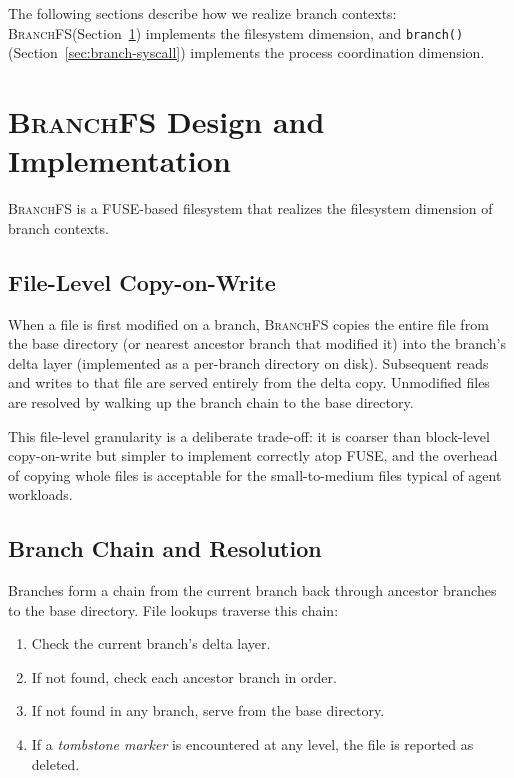 \documentclass[sigconf]{acmart}
\newcommand{\sys}{\textsc{BranchFS}\xspace}
\newcommand{\syscall}{\texttt{branch()}\xspace}
\begin{document}
\noindent The following sections describe how we realize branch contexts: \sys (Section~\ref{sec:branchfs}) implements the filesystem dimension, and \syscall (Section~\ref{sec:branch-syscall}) implements the process coordination dimension.

\section{\sys Design and Implementation}
\label{sec:branchfs}

\sys is a FUSE-based filesystem that realizes the filesystem dimension of branch contexts.

\subsection{File-Level Copy-on-Write}

When a file is first modified on a branch, \sys copies the entire file from the base directory (or nearest ancestor branch that modified it) into the branch's delta layer (implemented as a per-branch directory on disk). Subsequent reads and writes to that file are served entirely from the delta copy. Unmodified files are resolved by walking up the branch chain to the base directory.

This file-level granularity is a deliberate trade-off: it is coarser than block-level copy-on-write but simpler to implement correctly atop FUSE, and the overhead of copying whole files is acceptable for the small-to-medium files typical of agent workloads.

\subsection{Branch Chain and Resolution}

Branches form a chain from the current branch back through ancestor branches to the base directory. File lookups traverse this chain:

\begin{enumerate}
	\item Check the current branch's delta layer.
	\item If not found, check each ancestor branch in order.
	\item If not found in any branch, serve from the base directory.
	\item If a \emph{tombstone marker} is encountered at any level, the file is reported as deleted.
\end{enumerate}
\end{document}
